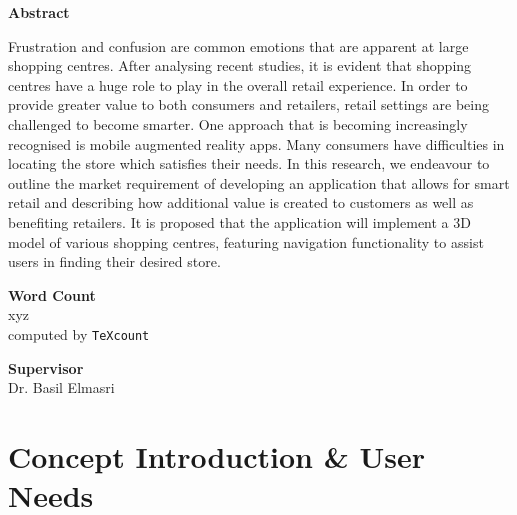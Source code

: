 \documentclass[12pt]{report}
\newcommand\blankpage{%
    \null
    \thispagestyle{empty}%
    \addtocounter{page}{-1}%
    \newpage}
\begin{document}
\begin{center}        
    \large
    \textbf{Abstract}\\
\end{center}

Frustration and confusion are common emotions that are apparent at large shopping centres. After analysing recent studies, it is evident that shopping centres have a huge role to play in the overall retail experience. In order to provide greater value to both consumers and retailers, retail settings are being challenged to become smarter. One approach that is becoming increasingly recognised is mobile augmented reality apps. Many consumers have difficulties in locating the store which satisfies their needs. In this research, we endeavour to outline the market requirement of developing an application that allows for smart retail and describing how additional value is created to customers as well as benefiting retailers. It is proposed that the application will implement a 3D model of various shopping centres, featuring navigation functionality to assist users in finding their desired store.\\

\vspace*{1.5cm}
\begin{center}    
    \large
    \textbf{Word Count}\\
    xyz\\
    \normalsize computed by \texttt{TeXcount}
\end{center}

\vspace*{1.5cm}
\begin{center}    
    \large
    \textbf{Supervisor}\\
    \normalsize Dr. Basil Elmasri
\end{center}

\afterpage{\blankpage}


\tableofcontents


\afterpage{\blankpage}
\printnomenclature[1in]

\afterpage{\blankpage}


\chapter{Concept Introduction \& User Needs}

\end{document}
